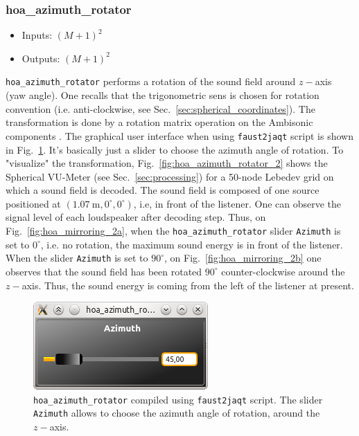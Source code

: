 \documentclass[10pt,a4paper]{article}
\begin{document}
\subsubsection{hoa\_azimuth\_rotator}
\begin{itemize}
\item Inputs: $(M+1)^2$
\item Outputs: $(M+1)^2$
\end{itemize}
\lstinline'hoa_azimuth_rotator' performs a rotation of the sound field around $z-$axis (yaw angle). One recalls that the trigonometric sens is chosen for rotation convention (i.e. anti-clockwise, see Sec.~\ref{sec:spherical_coordinates}). The transformation is done by a rotation matrix operation on the Ambisonic components \cite{daniel2000representation, moreau2006etude,kronlachner2014spatial}. The graphical user interface when using \lstinline'faust2jaqt' script is shown in Fig.~\ref{fig:hoa_azimuth_rotator}. It's basically just a slider to choose the azimuth angle of rotation. To "visualize" the transformation, Fig.~\ref{fig:hoa_azimuth_rotator_2} shows the Spherical VU-Meter (see Sec.~\ref{sec:processing}) for a 50-node Lebedev grid on which a sound field is decoded. The sound field is composed of one source positioned at $(1.07~\text{m}, 0^\circ, 0^\circ)$, i.e, in front of the listener. One can observe the signal level of each loudspeaker after decoding step. Thus, on Fig.~\ref{fig:hoa_mirroring_2a}, when the \lstinline'hoa_azimuth_rotator' slider \lstinline'Azimuth' is set to $0^\circ$, i.e. no rotation, the maximum sound energy is in front of the listener. When the slider \lstinline'Azimuth' is set to $90^\circ$, on Fig.~\ref{fig:hoa_mirroring_2b} one observes that the sound field has been rotated $90^\circ$ counter-clockwise around the $z-$axis. Thus, the sound energy is coming from the left of the listener at present.
\begin{figure}[!ht]
\centering
\includegraphics[width=0.3\columnwidth]{hoa_azimuth_rotator.png}
\caption{\lstinline'hoa_azimuth_rotator' compiled using \lstinline'faust2jaqt' script. The slider \lstinline'Azimuth' allows to choose the azimuth angle of rotation, around the $z-$axis.}
\label{fig:hoa_azimuth_rotator}
\end{figure}
\end{document}
